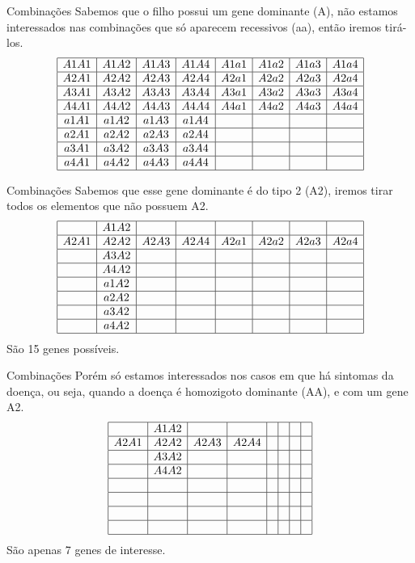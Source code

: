 \documentclass{beamer}
\begin{document}
\begin{frame}{Combinações}
		Sabemos que o filho possui um gene dominante (A), não estamos interessados nas combinações que só aparecem recessivos (aa), então iremos tirá-los.
		\[  \begin{array}{|c|c|c|c|c|c|c|c|}
			\hline
			A1A1 & A1A2 & A1A3 & A1A4 & A1a1 & A1a2 & A1a3 & A1a4\\ 
			\hline
			A2A1 & A2A2 & A2A3 & A2A4 & A2a1 & A2a2 & A2a3 & A2a4\\ 
			\hline
			A3A1 & A3A2 & A3A3 & A3A4 & A3a1 & A3a2 & A3a3 & A3a4\\ 
			\hline
			A4A1 & A4A2 & A4A3 & A4A4 & A4a1 & A4a2 & A4a3 & A4a4\\ 
			\hline
			a1A1 & a1A2 & a1A3 & a1A4 &&&&\\
			\hline
			a2A1 & a2A2 & a2A3 & a2A4 &&&&\\ 
			\hline
			a3A1 & a3A2 & a3A3 & a3A4 &&&&\\
			\hline
			a4A1 & a4A2 & a4A3 & a4A4 &&&&\\ 
			\hline
		\end{array}\]
\end{frame}

\begin{frame}{Combinações}
		Sabemos que esse gene dominante é do tipo 2 (A2), iremos tirar todos os elementos que não possuem A2.
		\[  \begin{array}{|c|c|c|c|c|c|c|c|}
			\hline
			& A1A2 &&&&&&\\ 
			\hline
			A2A1 & A2A2 & A2A3 & A2A4 & A2a1 & A2a2 & A2a3 & A2a4\\ 
			\hline
			& A3A2 &&&&&&\\ 
			\hline
			& A4A2 &&&&&&\\ 
			\hline
			& a1A2 &&&&&&\\ 
			\hline
			& a2A2 &&&&&&\\ 
			\hline
			& a3A2 &&&&&&\\ 
			\hline
			& a4A2 &&&&&&\\ 
			\hline
		\end{array}\]
		São 15 genes possíveis.
\end{frame}

\begin{frame}{Combinações}
		Porém só estamos interessados nos casos em que há sintomas da doença, ou seja, quando a doença é homozigoto dominante (AA), e com um gene A2.
		\[  \begin{array}{|c|c|c|c|c|c|c|c|}
			\hline
			& A1A2 &&&&&&\\ 
			\hline
			A2A1 & A2A2 & A2A3 & A2A4 &&&&\\ 
			\hline
			& A3A2 &&&&&&\\ 
			\hline
			& A4A2 &&&&&&\\ 
			\hline
			&&&&&&&\\ 
			\hline
			&&&&&&&\\ 
			\hline
			&&&&&&&\\ 
			\hline
			&&&&&&&\\ 
			\hline
		\end{array}\]
		São apenas 7 genes de interesse.
\end{frame}
\end{document}
